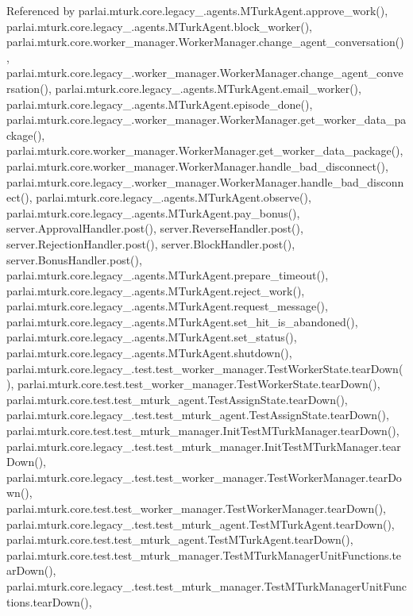 Referenced by parlai.\+mturk.\+core.\+legacy\+\_.\+agents.\+M\+Turk\+Agent.\+approve\+\_\+work(), parlai.\+mturk.\+core.\+legacy\+\_.\+agents.\+M\+Turk\+Agent.\+block\+\_\+worker(), parlai.\+mturk.\+core.\+worker\+\_\+manager.\+Worker\+Manager.\+change\+\_\+agent\+\_\+conversation(), parlai.\+mturk.\+core.\+legacy\+\_.\+worker\+\_\+manager.\+Worker\+Manager.\+change\+\_\+agent\+\_\+conversation(), parlai.\+mturk.\+core.\+legacy\+\_.\+agents.\+M\+Turk\+Agent.\+email\+\_\+worker(), parlai.\+mturk.\+core.\+legacy\+\_.\+agents.\+M\+Turk\+Agent.\+episode\+\_\+done(), parlai.\+mturk.\+core.\+legacy\+\_.\+worker\+\_\+manager.\+Worker\+Manager.\+get\+\_\+worker\+\_\+data\+\_\+package(), parlai.\+mturk.\+core.\+worker\+\_\+manager.\+Worker\+Manager.\+get\+\_\+worker\+\_\+data\+\_\+package(), parlai.\+mturk.\+core.\+worker\+\_\+manager.\+Worker\+Manager.\+handle\+\_\+bad\+\_\+disconnect(), parlai.\+mturk.\+core.\+legacy\+\_.\+worker\+\_\+manager.\+Worker\+Manager.\+handle\+\_\+bad\+\_\+disconnect(), parlai.\+mturk.\+core.\+legacy\+\_.\+agents.\+M\+Turk\+Agent.\+observe(), parlai.\+mturk.\+core.\+legacy\+\_.\+agents.\+M\+Turk\+Agent.\+pay\+\_\+bonus(), server.\+Approval\+Handler.\+post(), server.\+Reverse\+Handler.\+post(), server.\+Rejection\+Handler.\+post(), server.\+Block\+Handler.\+post(), server.\+Bonus\+Handler.\+post(), parlai.\+mturk.\+core.\+legacy\+\_.\+agents.\+M\+Turk\+Agent.\+prepare\+\_\+timeout(), parlai.\+mturk.\+core.\+legacy\+\_.\+agents.\+M\+Turk\+Agent.\+reject\+\_\+work(), parlai.\+mturk.\+core.\+legacy\+\_.\+agents.\+M\+Turk\+Agent.\+request\+\_\+message(), parlai.\+mturk.\+core.\+legacy\+\_.\+agents.\+M\+Turk\+Agent.\+set\+\_\+hit\+\_\+is\+\_\+abandoned(), parlai.\+mturk.\+core.\+legacy\+\_.\+agents.\+M\+Turk\+Agent.\+set\+\_\+status(), parlai.\+mturk.\+core.\+legacy\+\_.\+agents.\+M\+Turk\+Agent.\+shutdown(), parlai.\+mturk.\+core.\+legacy\+\_.\+test.\+test\+\_\+worker\+\_\+manager.\+Test\+Worker\+State.\+tear\+Down(), parlai.\+mturk.\+core.\+test.\+test\+\_\+worker\+\_\+manager.\+Test\+Worker\+State.\+tear\+Down(), parlai.\+mturk.\+core.\+test.\+test\+\_\+mturk\+\_\+agent.\+Test\+Assign\+State.\+tear\+Down(), parlai.\+mturk.\+core.\+legacy\+\_.\+test.\+test\+\_\+mturk\+\_\+agent.\+Test\+Assign\+State.\+tear\+Down(), parlai.\+mturk.\+core.\+test.\+test\+\_\+mturk\+\_\+manager.\+Init\+Test\+M\+Turk\+Manager.\+tear\+Down(), parlai.\+mturk.\+core.\+legacy\+\_.\+test.\+test\+\_\+mturk\+\_\+manager.\+Init\+Test\+M\+Turk\+Manager.\+tear\+Down(), parlai.\+mturk.\+core.\+legacy\+\_.\+test.\+test\+\_\+worker\+\_\+manager.\+Test\+Worker\+Manager.\+tear\+Down(), parlai.\+mturk.\+core.\+test.\+test\+\_\+worker\+\_\+manager.\+Test\+Worker\+Manager.\+tear\+Down(), parlai.\+mturk.\+core.\+legacy\+\_.\+test.\+test\+\_\+mturk\+\_\+agent.\+Test\+M\+Turk\+Agent.\+tear\+Down(), parlai.\+mturk.\+core.\+test.\+test\+\_\+mturk\+\_\+agent.\+Test\+M\+Turk\+Agent.\+tear\+Down(), parlai.\+mturk.\+core.\+test.\+test\+\_\+mturk\+\_\+manager.\+Test\+M\+Turk\+Manager\+Unit\+Functions.\+tear\+Down(), parlai.\+mturk.\+core.\+legacy\+\_.\+test.\+test\+\_\+mturk\+\_\+manager.\+Test\+M\+Turk\+Manager\+Unit\+Functions.\+tear\+Down(), 